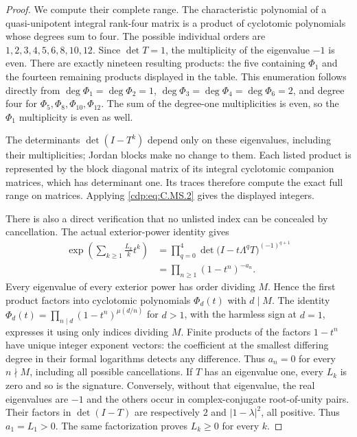 \begin{proof}
We compute their complete range. The characteristic
polynomial of a quasi-unipotent integral rank-four
matrix is a product of cyclotomic polynomials
whose degrees sum to four. The possible individual
orders are
$1,2,3,4,5,6,8,10,12$. Since $\det T=1$,
the multiplicity of the eigenvalue $-1$ is even.
There are exactly nineteen resulting products:
the five containing $\Phi_1$ and the fourteen
remaining products displayed in the table.
This enumeration follows directly from
$\deg\Phi_1=\deg\Phi_2=1$,
$\deg\Phi_3=\deg\Phi_4=\deg\Phi_6=2$,
and degree four for $\Phi_5,\Phi_8,\Phi_{10},
\Phi_{12}$. The sum of the degree-one
multiplicities is even, so the $\Phi_1$
multiplicity is even as well.

The determinants $\det(I-T^k)$ depend only on
these eigenvalues, including their multiplicities;
Jordan blocks make no change to them. Each listed
product is represented by the block diagonal
matrix of its integral cyclotomic companion
matrices, which has determinant one. Its traces
therefore compute the exact full range on
matrices. Applying \eqref{cdp:eq:C.MS.2} gives the displayed
integers.

There is also a direct verification that no
unlisted index can be concealed by cancellation.
The actual exterior-power identity gives
\[
 \begin{aligned}
 \exp\!\left(\sum_{k\ge1}\frac{L_k}{k}t^k\right)
 &=\prod_{q=0}^4
       \det\bigl(I-t\Lambda^qT\bigr)^{(-1)^{q+1}}\\
 &=\prod_{n\ge1}(1-t^n)^{-a_n}.
 \end{aligned}                                  \tag{C.MS.7}\label{cdp:eq:C.MS.7}
\]
Every eigenvalue of every exterior power has
order dividing $M$. Hence the first product
factors into cyclotomic polynomials $\Phi_d(t)$
with $d\mid M$. The identity
$\Phi_d(t)=\prod_{n\mid d}(1-t^n)^{\mu(d/n)}$
for $d>1$, with the harmless sign at $d=1$,
expresses it using only indices dividing $M$.
Finite products of the factors $1-t^n$ have
unique integer exponent vectors: the coefficient
at the smallest differing degree in their
formal logarithms detects any difference.
Thus $a_n=0$ for every $n\nmid M$, including
all possible cancellations. If $T$ has an
eigenvalue one, every $L_k$ is zero and so is
the signature. Conversely, without that
eigenvalue, the real eigenvalues are $-1$
and the others occur in complex-conjugate
root-of-unity pairs. Their factors in
$\det(I-T)$ are respectively $2$ and
$|1-\lambda|^2$, all positive. Thus $a_1=L_1>0$.
The same factorization proves $L_k\ge0$ for
every $k$.


\end{proof}
